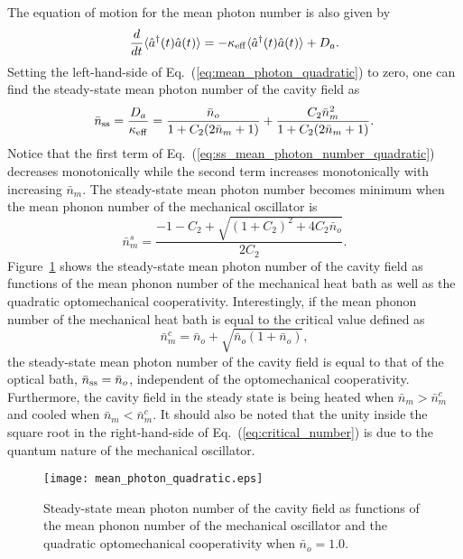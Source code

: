 \documentclass[pra,aps,showpacs,twocolumn,floatfix, superscriptaddress, nofootinbib, nobibnotes]{revtex4-1}
\begin{document}
The equation of motion for the mean photon number is also given by 
\begin{equation}
 \frac{d}{dt}\langle \hat a^\dag(t) \hat a(t)\rangle=-\kappa_{\rm eff}\langle \hat a^\dag(t) \hat a(t)\rangle+D_a. 
 \label{eq:mean_photon_quadratic}
\end{equation}
Setting the left-hand-side of Eq.~(\ref{eq:mean_photon_quadratic}) to zero, one can find the steady-state mean photon number of the cavity field as 
\begin{equation}
\bar n_{\rm ss} = \frac{D_a}{\kappa_{\rm eff}}= \frac{\bar n_o }{1+C_2(2\bar n_m+1)}+\frac{ C_2\bar n_m^2}{1+C_2(2\bar n_m+1)} . 
\label{eq:ss_mean_photon_number_quadratic}
\end{equation}
Notice that the first term of Eq.~(\ref{eq:ss_mean_photon_number_quadratic}) decreases monotonically while the second term increases monotonically with increasing $\bar n_m$. The steady-state mean photon number becomes minimum when the mean phonon number of the mechanical oscillator is
\begin{equation}
 \bar n_m^{s} = \frac{-1-C_2+\sqrt{(1+C_2)^2+4C_2 \bar n_o}}{2C_2}. 
\end{equation}
Figure~\ref{fig:Mean_photon_number_quadratic} shows the steady-state mean photon number of the cavity field as functions of the mean phonon number of the mechanical heat bath as well as the quadratic optomechanical cooperativity. Interestingly, if the mean phonon number of the mechanical heat bath is equal to the critical value defined as
\begin{equation}
 \bar n_{m}^{c} = \bar n_o+\sqrt{\bar n_o(1+\bar n_o)},
 \label{eq:critical_number}
\end{equation}
the steady-state mean photon number of the cavity field is equal to that of the optical bath, $\bar n_{\rm ss}=\bar n_o$, independent of the optomechanical cooperativity. Furthermore, the cavity field in the steady state is being heated when $\bar n_m>\bar n_{m}^{c}$ and cooled when $\bar n_m<\bar n_{m}^{c}$. It should also be noted that the unity inside the square root in the right-hand-side of Eq.~(\ref{eq:critical_number}) is due to the quantum nature of the mechanical oscillator. 

\begin{figure}[]
\texttt{[image: mean\_photon\_quadratic.eps]}
\caption{Steady-state mean photon number of the cavity field as functions of the mean phonon number of the mechanical oscillator and the quadratic optomechanical cooperativity when $\bar n_o=1.0$. }
\label{fig:Mean_photon_number_quadratic}
\end{figure}
\end{document}
